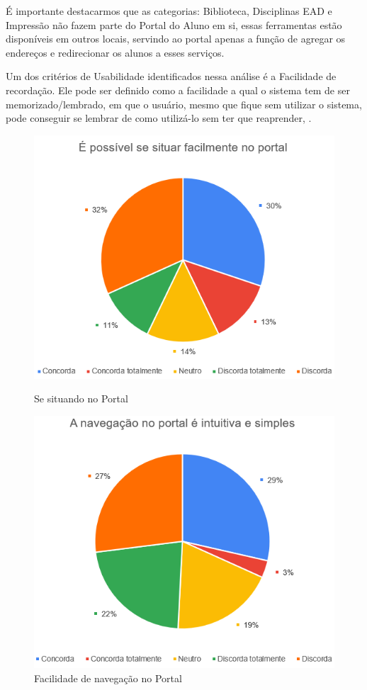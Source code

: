 \documentclass[12pt]{article}
\begin{document}
É importante destacarmos que as categorias: Biblioteca, Disciplinas EAD e Impressão não fazem parte do Portal do Aluno em si, essas ferramentas estão disponíveis em outros locais, servindo ao portal apenas a função de agregar os endereços e redirecionar os alunos a esses serviços.

Um dos critérios de Usabilidade identificados nessa análise é a Facilidade de recordação. Ele pode ser definido como a facilidade a qual o sistema tem de ser memorizado/lembrado, em que o usuário, mesmo que fique sem utilizar o sistema, pode conseguir se lembrar de como utilizá-lo sem ter que reaprender, . 
\FloatBarrier
\begin{figure}
	\centering    
	\begin{minipage}{.4\columnwidth}
		\centering    
		\includegraphics[width=\textwidth,frame]{img10.png}
		\caption{Se situando no Portal}
		\label{fig:grafico7}
	\end{minipage}
	\begin{minipage}{.4\columnwidth}
		\centering
		\includegraphics[width=\textwidth,frame]{img11.png}
		\caption{Facilidade de navegação no Portal}
		\label{fig:grafico8}
	\end{minipage}
\end{figure}
\end{document}
